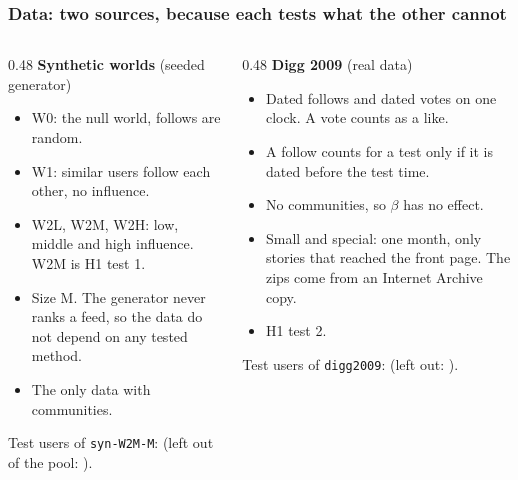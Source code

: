\documentclass[aspectratio=169,11pt]{beamer}
\begin{document}
\begin{frame}
  \frametitle{Data: two sources, because each tests what the other cannot}
  \begin{columns}[T]
    \begin{column}{0.48\textwidth}
      \textbf{Synthetic worlds} (seeded generator)
      \begin{itemize}\small
        \item W0: the null world, follows are random.
        \item W1: similar users follow each other, no influence.
        \item W2L, W2M, W2H: low, middle and high influence. W2M is H1 test 1.
        \item Size M. The generator never ranks a feed, so the data do not depend on any tested method.
        \item The only data with communities.
      \end{itemize}
      Test users of \texttt{syn-W2M-M}: \eOneWTwoMTestUsersAllN{} (left out of the pool: \eOneWTwoMLeftOutAllN{}).
    \end{column}
    \begin{column}{0.48\textwidth}
      \textbf{Digg 2009} (real data)
      \begin{itemize}\small
        \item Dated follows and dated votes on one clock. A vote counts as a like.
        \item A follow counts for a test only if it is dated before the test time.
        \item No communities, so $\beta$ has no effect.
        \item Small and special: one month, only stories that reached the front page. The zips come from an Internet Archive copy.
        \item H1 test 2.
      \end{itemize}
      Test users of \texttt{digg2009}: \eOneDiggTestUsersAllN{} (left out: \eOneDiggLeftOutAllN{}).
    \end{column}
  \end{columns}
\end{frame}
\end{document}

